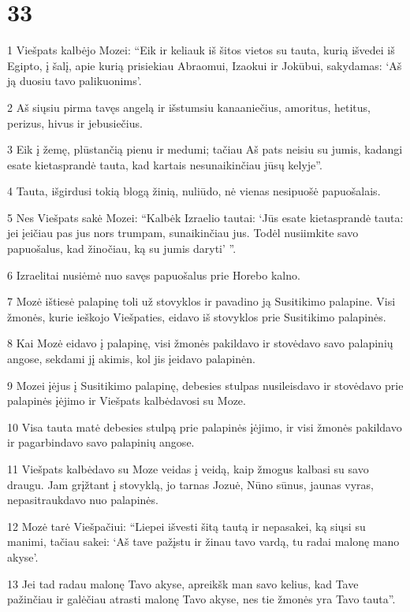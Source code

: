 \chapter{33}

\par 1 Viešpats kalbėjo Mozei: “Eik ir keliauk iš šitos vietos su tauta, kurią išvedei iš Egipto, į šalį, apie kurią prisiekiau Abraomui, Izaokui ir Jokūbui, sakydamas: ‘Aš ją duosiu tavo palikuonims’. 
\par 2 Aš siųsiu pirma tavęs angelą ir išstumsiu kanaaniečius, amoritus, hetitus, perizus, hivus ir jebusiečius. 
\par 3 Eik į žemę, plūstančią pienu ir medumi; tačiau Aš pats neisiu su jumis, kadangi esate kietasprandė tauta, kad kartais nesunaikinčiau jūsų kelyje”. 
\par 4 Tauta, išgirdusi tokią blogą žinią, nuliūdo, nė vienas nesipuošė papuošalais. 
\par 5 Nes Viešpats sakė Mozei: “Kalbėk Izraelio tautai: ‘Jūs esate kietasprandė tauta: jei įeičiau pas jus nors trumpam, sunaikinčiau jus. Todėl nusiimkite savo papuošalus, kad žinočiau, ką su jumis daryti’ ”. 
\par 6 Izraelitai nusiėmė nuo savęs papuošalus prie Horebo kalno. 
\par 7 Mozė ištiesė palapinę toli už stovyklos ir pavadino ją Susitikimo palapine. Visi žmonės, kurie ieškojo Viešpaties, eidavo iš stovyklos prie Susitikimo palapinės. 
\par 8 Kai Mozė eidavo į palapinę, visi žmonės pakildavo ir stovėdavo savo palapinių angose, sekdami jį akimis, kol jis įeidavo palapinėn. 
\par 9 Mozei įėjus į Susitikimo palapinę, debesies stulpas nusileisdavo ir stovėdavo prie palapinės įėjimo ir Viešpats kalbėdavosi su Moze. 
\par 10 Visa tauta matė debesies stulpą prie palapinės įėjimo, ir visi žmonės pakildavo ir pagarbindavo savo palapinių angose. 
\par 11 Viešpats kalbėdavo su Moze veidas į veidą, kaip žmogus kalbasi su savo draugu. Jam grįžtant į stovyklą, jo tarnas Jozuė, Nūno sūnus, jaunas vyras, nepasitraukdavo nuo palapinės. 
\par 12 Mozė tarė Viešpačiui: “Liepei išvesti šitą tautą ir nepasakei, ką siųsi su manimi, tačiau sakei: ‘Aš tave pažįstu ir žinau tavo vardą, tu radai malonę mano akyse’. 
\par 13 Jei tad radau malonę Tavo akyse, apreikšk man savo kelius, kad Tave pažinčiau ir galėčiau atrasti malonę Tavo akyse, nes tie žmonės yra Tavo tauta”. 
